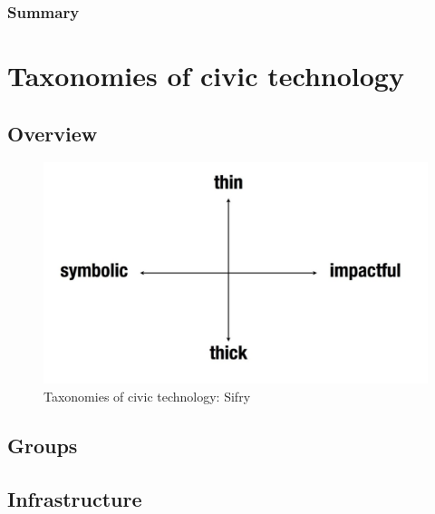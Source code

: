 \documentclass{article}
\begin{document}
        	\subsubsection*{Summary}
        	
        	
        	 
\section*{Taxonomies of civic technology}

        \subsection*{Overview}
        
        
			\begin{figure}[h]
				\centering
				\includegraphics[scale=0.5]{images/taxonomy-sifry}
				\caption{Taxonomies of civic technology: Sifry}
				\label{fig:taxonomy-sifry}
			\end{figure}
			        
        \subsection*{Groups}
        
        
        \subsection*{Infrastructure}
        
\end{document}
